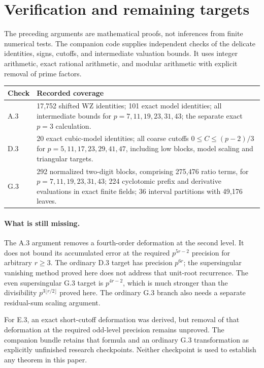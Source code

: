 \documentclass[11pt,letterpaper]{article}
\numberwithin{equation}{section}
\begin{document}
\section{Verification and remaining targets}\label{loc-IV-8}
The preceding arguments are mathematical proofs, not inferences from
finite numerical tests. The companion code supplies independent checks
of the delicate identities, signs, cutoffs, and intermediate valuation
bounds. It uses integer arithmetic, exact rational arithmetic, and
modular arithmetic with explicit removal of prime factors.

\begin{center}
\small
\begin{tabular}{@{}p{.15\linewidth}p{.77\linewidth}@{}}
\toprule
Check & Recorded coverage \\
\midrule
A.3 & 17,752 shifted WZ identities; 101 exact model identities;
all intermediate bounds for $p=7,11,19,23,31,43$;
the separate exact $p=3$ calculation. \\[4pt]
D.3 & 20 exact cubic-model identities; all coarse cutoffs
$0\le C\le(p-2)/3$ for $p=5,11,17,23,29,41,47$,
including low blocks, model scaling and triangular targets. \\[4pt]
G.3 & 292 normalized two-digit blocks, comprising 275,476 ratio terms,
for $p=7,11,19,23,31,43$; 224 cyclotomic prefix and derivative
evaluations in exact finite fields; 36 interval partitions with
49,176 leaves. \\
\bottomrule
\end{tabular}
\end{center}

\paragraph{What is still missing.}
The A.3 argument removes a fourth-order deformation at the second
level. It does not bound its accumulated error at the required
$p^{5r-2}$ precision for arbitrary $r\ge3$. The ordinary D.3 target
has precision $p^{6r}$; the supersingular vanishing method proved here
does not address that unit-root recurrence. The even supersingular
G.3 target is $p^{4r-2}$, which is much stronger than the divisibility
$p^{3\lfloor r/2\rfloor}$ proved here. The ordinary G.3 branch also
needs a separate residual-sum scaling argument.

For E.3, an exact short-cutoff deformation was derived, but removal
of that deformation at the required odd-level precision remains
unproved. The companion bundle retains that formula and an ordinary
G.3 transformation as explicitly unfinished research checkpoints.
Neither checkpoint is used to establish any theorem in this paper.
\end{document}
